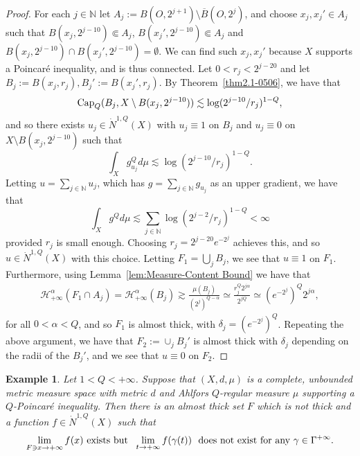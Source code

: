 \documentclass[10pt]{amsart}
\newtheorem{example}[theorem]{Example}
\numberwithin{equation}{section}
\newcommand{\N}{\mathbb{N}}
\newcommand{\Ha}{\mathcal{H}}
\begin{document}
\begin{proof}
For each $j\in\N$ let $A_j:=B(O,2^{j+1})\setminus\overline B(O,2^j)$, and choose $x_j, x_j'\in A_j$ such that $B(x_j,2^{j-10})\Subset A_j$, $B(x_j',2^{j-10})\Subset A_j$ and $B(x_j, 2^{j-10})\cap B(x_j',2^{j-10})=\emptyset$.  We can find such  $x_j, x_{j}'$ because $X$ supports a Poincar\'e inequality, and is thus connected.  Let $0<r_j<2^{j-20}$ and let $B_j:=B(x_j,r_j), B_j':=B(x_j',r_j)$.  By Theorem~\ref{thm2.1-0506}, we have that 
\[
\text{\rm Cap}_Q(B_j,X\setminus B(x_j,2^{j-10}))\lesssim\log(2^{j-10}/r_j)^{1-Q},
\]
and so there exists $u_j\in \dot N^{1,Q}(X)$ with $u_j\equiv 1$ on $B_j$ and $u_j\equiv 0$ on $X\setminus B(x_j,2^{j-10})$ such that 
\[
\int_{X}g_{u_j}^Qd\mu\lesssim\log(2^{j-10}/r_j)^{1-Q}.
\]
Letting $u=\sum_{j\in\mathbb N} u_j$, which has $g=\sum_{j\in\mathbb N} g_{u_j}$ as an upper gradient, we have that
\[
\int_X g^Qd\mu\lesssim\sum_{j\in\mathbb N}\log(2^{j-2}/r_j)^{1-Q}<\infty
\]
provided $r_j$ is small enough.  Choosing $r_j=2^{j-20}e^{-2^j}$ achieves this, and so $u\in\dot N^{1,Q}(X)$ with this choice.  Letting $F_1=\bigcup_j B_j$, we see that $u\equiv 1$ on $F_1$.  Furthermore, using Lemma~\ref{lem:Measure-Content Bound} we have that 
\begin{align*}
   \Ha^\alpha_{+\infty}(F_1\cap A_j)=\Ha^\alpha_{+\infty}(B_j)\gtrsim\frac{\mu(B_j)}{(2^j)^{Q-\alpha}}\simeq \frac{r_{j}^Q 2^{j\alpha}}{2^{jQ}}\simeq (e^{-2^j})^Q2^{j\alpha},   
\end{align*}
for all $0<\alpha<Q$, and so $F_1$ is almost thick, with $\delta_j=(e^{-2^j})^Q$.  
Repeating the above argument, 
we have that $F_2:=\cup_j B_j'$ is almost thick with $\delta_j$ depending on the radii of the $B_j'$, and we see that $u\equiv 0$ on $F_2$.   
\end{proof}

 \begin{example}
 \label{example5.4-0709} Let $1<Q<+\infty$. Suppose that $(X,d,\mu)$ is a complete, unbounded metric measure space with metric $d$ and Ahlfors $Q$-regular measure $\mu$ supporting a $Q$-Poincar\'e inequality.  Then  there is an almost thick set $F$ which is not thick and a function $f\in \dot N^{1,Q}(X)$ such that
 \begin{equation}\label{eq6.3-0809}
 	\text{\rm  $\lim_{F\ni x\to+\infty}f(x)$ exists but\ \ }\lim_{t\to+\infty} f(\gamma(t)) \text{\rm \ \ does not exist for any $\gamma\in\Gamma^{+\infty}$.}
 \end{equation}
 \end{example}
 
\end{document}
